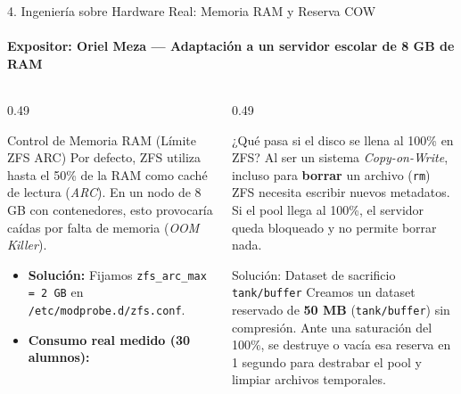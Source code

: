 \documentclass[aspectratio=169,10pt]{beamer}
\begin{document}
\begin{frame}{4. Ingeniería sobre Hardware Real: Memoria RAM y Reserva COW}
    \framesubtitle{Expositor: Oriel Meza — Adaptación a un servidor escolar de 8 GB de RAM}
    \begin{columns}[T]
        \begin{column}{0.49\textwidth}
            \begin{block}{Control de Memoria RAM (Límite ZFS ARC)}
                \footnotesize
                Por defecto, ZFS utiliza hasta el 50\% de la RAM como caché de lectura (\textit{ARC}). En un nodo de 8 GB con contenedores, esto provocaría caídas por falta de memoria (\textit{OOM Killer}).
                \begin{itemize}
                    \item \textbf{Solución:} Fijamos \texttt{zfs\_arc\_max = 2 GB} en \texttt{/etc/modprobe.d/zfs.conf}.
                    \item \textbf{Consumo real medido (30 alumnos):}
                \end{itemize}
            \end{block}
        \end{column}
        \begin{column}{0.49\textwidth}
            \begin{alertblock}{¿Qué pasa si el disco se llena al 100\% en ZFS?}
                \footnotesize
                Al ser un sistema \textit{Copy-on-Write}, incluso para \textbf{borrar} un archivo (\texttt{rm}) ZFS necesita escribir nuevos metadatos. Si el pool llega al 100\%, el servidor queda bloqueado y no permite borrar nada.
            \end{alertblock}
            \begin{exampleblock}{Solución: Dataset de sacrificio \texttt{tank/buffer}}
                \footnotesize
                Creamos un dataset reservado de \textbf{50 MB} (\texttt{tank/buffer}) sin compresión. Ante una saturación del 100\%, se destruye o vacía esa reserva en 1 segundo para destrabar el pool y limpiar archivos temporales.
            \end{exampleblock}
        \end{column}
    \end{columns}
\end{frame}
\end{document}
